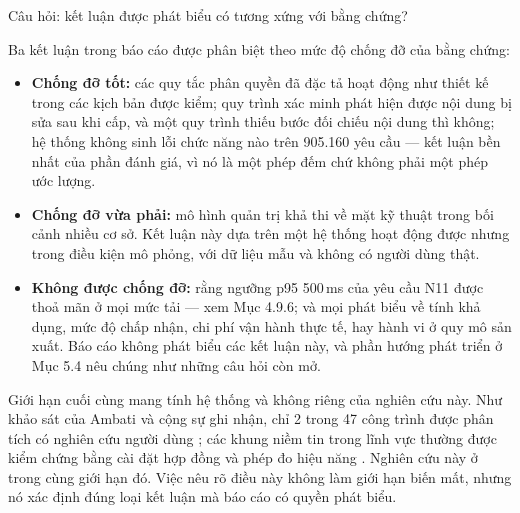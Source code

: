 Câu hỏi: kết luận được phát biểu có tương xứng với bằng chứng?

Ba kết luận trong báo cáo được phân biệt theo mức độ chống đỡ của bằng chứng:

\begin{itemize}
    \item \textbf{Chống đỡ tốt:} các quy tắc phân quyền đã đặc tả hoạt động như thiết kế trong các kịch bản được kiểm; quy trình xác minh phát hiện được nội dung bị sửa sau khi cấp, và một quy trình thiếu bước đối chiếu nội dung thì không; hệ thống không sinh lỗi chức năng nào trên 905.160 yêu cầu --- kết luận bền nhất của phần đánh giá, vì nó là một phép đếm chứ không phải một phép ước lượng.
    \item \textbf{Chống đỡ vừa phải:} mô hình quản trị khả thi về mặt kỹ thuật trong bối cảnh nhiều cơ sở. Kết luận này dựa trên một hệ thống hoạt động được nhưng trong điều kiện mô phỏng, với dữ liệu mẫu và không có người dùng thật.
    \item \textbf{Không được chống đỡ:} rằng ngưỡng p95 500\,ms của yêu cầu N11 được thoả mãn ở mọi mức tải --- xem Mục 4.9.6; và mọi phát biểu về tính khả dụng, mức độ chấp nhận, chi phí vận hành thực tế, hay hành vi ở quy mô sản xuất. Báo cáo không phát biểu các kết luận này, và phần hướng phát triển ở Mục 5.4 nêu chúng như những câu hỏi còn mở.
\end{itemize}

Giới hạn cuối cùng mang tính hệ thống và không riêng của nghiên cứu này. Như khảo sát của Ambati và cộng sự ghi nhận, chỉ 2 trong 47 công trình được phân tích có nghiên cứu người dùng \cite{Ambati2026}; các khung niềm tin trong lĩnh vực thường được kiểm chứng bằng cài đặt hợp đồng và phép đo hiệu năng \cite{DeSalve2023}. Nghiên cứu này ở trong cùng giới hạn đó. Việc nêu rõ điều này không làm giới hạn biến mất, nhưng nó xác định đúng loại kết luận mà báo cáo có quyền phát biểu.

